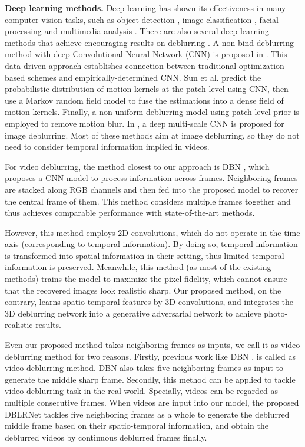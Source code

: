 \documentclass[journal]{IEEEtran}
\begin{document}
\textbf{Deep learning methods.} Deep learning has shown its effectiveness in many computer vision tasks, such as object detection \cite{ren2015faster}, image classification \cite{krizhevsky2012imagenet,simonyan2014very,szegedy2015going,he2016deep}, facial processing \cite{sun2013deep,sun2014deep,sun2015learning,zhang122015kinship,zhang2017facial} and multimedia analysis \cite{ji20133d,simonyan2014two,ledig2016photo}. There are also several deep learning methods that achieve encouraging results on deblurring \cite{xu2014deep,sun2015learning,nah2016deep,su2016deep,Nimisha_2017_ICCV,kim2017online,kim2017dynamic}. A non-bind deblurring method with deep Convolutional Neural Network (CNN) is proposed in \cite{xu2014deep}. This data-driven approach establishes connection between traditional optimization-based schemes and empirically-determined CNN. Sun et al. \cite{sun2015learning} predict the probabilistic distribution of motion kernels at the patch level using CNN, then use a Markov random field model to fuse the estimations into a dense field of motion kernels. Finally, a non-uniform deblurring model using patch-level prior is employed to remove motion blur. In \cite{nah2016deep}, a deep multi-scale CNN is proposed for image deblurring. Most of these methods aim at image deblurring, so they do not need to consider temporal information implied in videos.

For video deblurring, the method closest to our approach is DBN \cite{su2016deep}, which proposes a CNN model to process information across frames. Neighboring frames are stacked along RGB channels and then fed into the proposed model to recover the central frame of them. This method considers multiple frames together and thus achieves comparable performance with state-of-the-art methods.

However, this method employs 2D convolutions, which do not operate in the time axis (corresponding to temporal information). By doing so, temporal information is transformed into spatial information in their setting, thus limited temporal information is preserved. Meanwhile, this method (as most of the existing methods) trains the model to maximize the pixel fidelity, which cannot ensure that the recovered images look realistic sharp. Our proposed method, on the contrary, learns spatio-temporal features by 3D convolutions, and integrates the 3D deblurring network into a generative adversarial network to achieve photo-realistic results.

Even our proposed method takes neighboring frames as inputs, we call it as video deblurring method for two reasons. Firstly, previous work like DBN \cite{su2016deep}, is called as video deblurring method. DBN also takes five neighboring frames as input to generate the middle sharp frame. Secondly, this method can be applied to tackle video deblurring task in the real world. Specially, videos can be regarded as multiple consecutive frames. When videos are input into our model, the proposed DBLRNet tackles five neighboring frames as a whole to generate the deblurred middle frame based on their spatio-temporal information, and obtain the deblurred videos by continuous deblurred frames finally.
\end{document}
